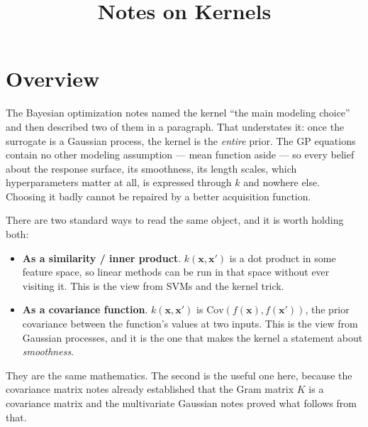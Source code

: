 \documentclass[conference]{IEEEtran}
\title{Notes on Kernels}
\author{
\IEEEauthorblockN{Luis Mendez}
}
\begin{document}
\maketitle

\section*{Overview}
The Bayesian optimization notes named the kernel ``the main modeling choice'' and then described two of them in a paragraph. That understates it: once the surrogate is a Gaussian process, the kernel is the \textit{entire} prior. The GP equations contain no other modeling assumption --- mean function aside --- so every belief about the response surface, its smoothness, its length scales, which hyperparameters matter at all, is expressed through $k$ and nowhere else. Choosing it badly cannot be repaired by a better acquisition function.

There are two standard ways to read the same object, and it is worth holding both:
\begin{itemize}
    \item \textbf{As a similarity / inner product}. $k(\mathbf{x},\mathbf{x}')$ is a dot product in some feature space, so linear methods can be run in that space without ever visiting it. This is the view from SVMs and the kernel trick.
    \item \textbf{As a covariance function}. $k(\mathbf{x},\mathbf{x}')$ is $\mathrm{Cov}(f(\mathbf{x}), f(\mathbf{x}'))$, the prior covariance between the function's values at two inputs. This is the view from Gaussian processes, and it is the one that makes the kernel a statement about \textit{smoothness}.
\end{itemize}
They are the same mathematics. The second is the useful one here, because the covariance matrix notes already established that the Gram matrix $K$ is a covariance matrix and the multivariate Gaussian notes proved what follows from that.
\end{document}
